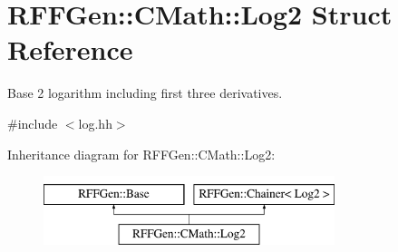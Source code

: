 \hypertarget{structRFFGen_1_1CMath_1_1Log2}{\section{R\-F\-F\-Gen\-:\-:C\-Math\-:\-:Log2 Struct Reference}
\label{structRFFGen_1_1CMath_1_1Log2}
}


Base 2 logarithm including first three derivatives.  




{\ttfamily \#include $<$log.\-hh$>$}

Inheritance diagram for R\-F\-F\-Gen\-:\-:C\-Math\-:\-:Log2\-:\begin{figure}[H]
\begin{center}
\leavevmode
\includegraphics[height=2.000000cm]{structRFFGen_1_1CMath_1_1Log2}
\end{center}
\end{figure}
